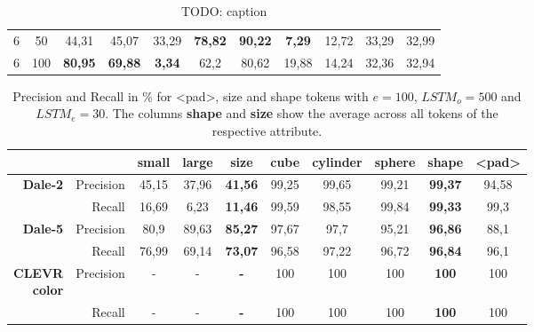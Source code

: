 \begin{table}[ht]
\begin{tabular}{cc|ccc|ccc|ccc}
        {6}                           & {50}   & {44,31}                             & {45,07}                             & {33,29}                                  & {\textbf{78,82}} & {\textbf{90,22}} & {\textbf{7,29}} & {12,72}      & {33,29}     & {32,99}     \\
        {6}                           & {100}  & {\textbf{80,95}}                    & {\textbf{69,88}}                    & {\textbf{3,34}}                          & {62,2}           & {80,62}          & {19,88}         & {14,24}      & {32,36}     & {32,94}     \\
        \bottomrule
    \end{tabular}
    \caption{TODO: caption}
    \label{TODO: label}
\end{table}

\begin{table}[ht]
    \centering
    \begin{tabular}{rr|cc|c|ccc|c|c}
        \toprule
                                         &             & {small} & {large} & \textbf{size}  & {cube}  & {cylinder} & {sphere} & \textbf{shape} & {<pad>} \\\midrule
        \multirow{2}{*}{\textbf{Dale-2}} & {Precision} & {45,15} & {37,96} & \textbf{41,56} & {99,25} & {99,65}    & {99,21}  & \textbf{99,37} & {94,58} \\
                                         & {Recall}    & {16,69} & {6,23}  & \textbf{11,46} & {99,59} & {98,55}    & {99,84}  & \textbf{99,33} & {99,3}  \\\midrule
        \multirow{2}{*}{\textbf{Dale-5}} & {Precision} & {80,9}  & {89,63} & \textbf{85,27} & {97,67} & {97,7}     & {95,21}  & \textbf{96,86} & {88,1}  \\
                                         & {Recall}    & {76,99} & {69,14} & \textbf{73,07} & {96,58} & {97,22}    & {96,72}  & \textbf{96,84} & {96,1}  \\\midrule
        \multirowcell{2}[0pt][r]{\textbf{CLEVR}                                                                                                          \\\textbf{color}} & {Precision}  & {-}     & {-}     & \textbf{-}     & {100}   & {100}      & {100}    & \textbf{100}   & {100}   \\
                                         & {Recall}    & {-}     & {-}     & \textbf{-}     & {100}   & {100}      & {100}    & \textbf{100}   & {100}   \\
        \bottomrule
    \end{tabular}
    \caption{Precision and Recall in \% for <pad>, size and shape tokens with $e=100$, $LSTM_o=500$ and $LSTM_e=30$. The columns \textbf{shape} and \textbf{size} show the average across all tokens of the respective attribute.}
    \label{tab:results:bb-re-generator_size-shape}
\end{table}

